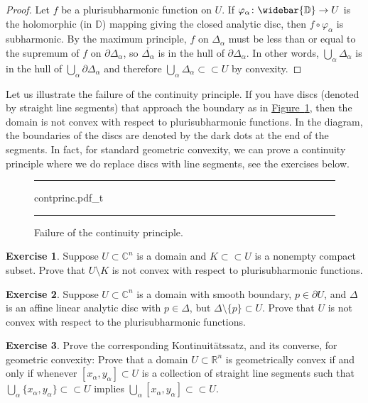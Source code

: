 \documentclass[12pt,openany]{book}
\newcommand{\C}{{\mathbb{C}}}
\newcommand{\R}{{\mathbb{R}}}
\newcommand{\D}{{\mathbb{D}}}
\theoremstyle{plain}
\theoremstyle{remark}
\theoremstyle{definition}
\newenvironment{exbox}{%
    \def\FrameCommand{\vrule width 1pt \relax\hspace{10pt}}%
    \MakeFramed{\advance\hsize-\width\FrameRestore}%
}{%
    \endMakeFramed
}
\newenvironment{myfig}{%
\begin{figure}[h!t]
\noindent\rule{\textwidth}{0.5pt}\vspace{12pt}\par\centering}%
{\par\noindent\rule{\textwidth}{0.5pt}
\end{figure}}
\theoremstyle{exercise}
\newtheorem{exercise}{Exercise}[section]
\theoremstyle{example}
\newcommand{\figureref}[1]{\hyperref[#1]{Figure~\ref*{#1}}}
\begin{document}
\begin{proof}
Let $f$ be a plurisubharmonic function on $U$.  If $\varphi_\alpha \colon
\widebar{\D} \to U$ is the holomorphic (in $\D$) mapping giving the closed
analytic disc, then $f \circ \varphi_\alpha$ is subharmonic.
By the maximum principle,
$f$ on $\Delta_\alpha$ must be less than or equal to the supremum
of $f$ on $\partial \Delta_\alpha$, so $\overline{\Delta_\alpha}$
is in the hull of
$\partial \Delta_\alpha$.
In other words,
$\bigcup_\alpha \Delta_\alpha$ is in the hull of
$\bigcup_\alpha \partial \Delta_\alpha$ and therefore
$\bigcup_\alpha \Delta_\alpha \subset \subset U$ by convexity.
\end{proof}

Let us illustrate the failure of the continuity principle.
If you have discs (denoted by straight line segments)
that approach the boundary as in \figureref{fig:contprinc},
then the domain is not convex with respect to plurisubharmonic functions.
In the diagram, the boundaries of the discs are
denoted by the dark dots at the end of the segments.
In fact, for standard geometric convexity,
we can prove a continuity principle where
we do replace discs with line segments,
see the exercises below.

\begin{myfig}
{contprinc.pdf_t}
\caption{Failure of the continuity principle.\label{fig:contprinc}}
\end{myfig}

\begin{exbox}
\begin{exercise}
Suppose $U \subset \C^n$ is a domain and $K \subset \subset U$ is a nonempty
compact subset.  Prove that $U \setminus K$ is not convex with respect to
plurisubharmonic functions.
\end{exercise}

\begin{exercise} \label{exercise:affinedisctouchingsmooth}
Suppose $U \subset \C^n$ is a domain with smooth boundary,
$p \in \partial U$,
and $\Delta$ is an affine linear analytic disc with $p \in \Delta$, but
$\Delta \setminus \{ p \} \subset U$.  Prove that $U$ is not convex with
respect to the plurisubharmonic functions.
\end{exercise}

\begin{exercise}
Prove the corresponding
Kontinuit\"atssatz, and its converse, for geometric convexity:
Prove that a domain $U \subset \R^n$ is geometrically convex if and only if
whenever $[x_\alpha,y_\alpha] \subset U$
is a collection of straight line segments such that
$\bigcup_{\alpha} \{ x_\alpha,y_\alpha \} \subset \subset U$
implies
$\bigcup_{\alpha} [ x_\alpha,y_\alpha ] \subset \subset U$.
\end{exercise}
\end{exbox}
\end{document}
